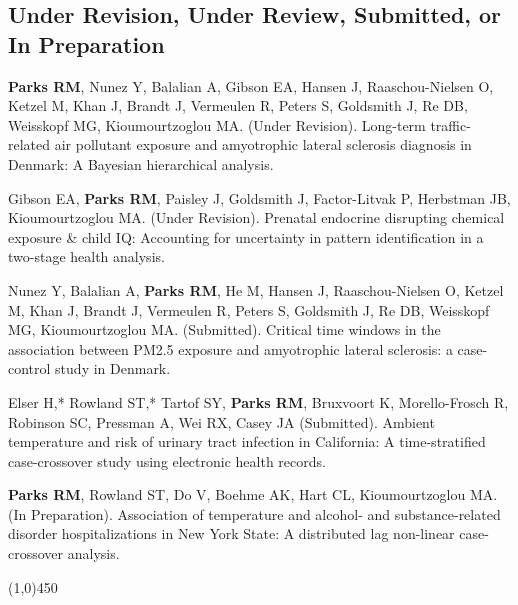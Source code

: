 \subsection*{Under Revision, Under Review, Submitted, or In Preparation}

\noindent \textbf{Parks RM}, Nunez Y, Balalian A,  Gibson EA, Hansen J, Raaschou-Nielsen O, Ketzel M, Khan J, Brandt J, Vermeulen R, Peters S, Goldsmith J, Re DB, Weisskopf MG, Kioumourtzoglou MA. (Under Revision). Long-term traffic-related air pollutant exposure and amyotrophic lateral sclerosis diagnosis in Denmark: A Bayesian hierarchical analysis. \medskip

\noindent Gibson EA, \textbf{Parks RM}, Paisley J, Goldsmith J, Factor-Litvak P, Herbstman JB, Kioumourtzoglou MA. (Under Revision). Prenatal endocrine disrupting chemical exposure \& child IQ: Accounting for uncertainty in pattern identification in a two-stage health analysis. \medskip

\noindent Nunez Y, Balalian A, \textbf{Parks RM}, He M, Hansen J, Raaschou-Nielsen O, Ketzel M, Khan J, Brandt J, Vermeulen R, Peters S, Goldsmith J, Re DB, Weisskopf MG, Kioumourtzoglou MA. (Submitted). Critical time windows in the association between PM2.5 exposure and amyotrophic lateral sclerosis: a case-control study in Denmark. \medskip

\noindent Elser H,* Rowland ST,* Tartof SY, \textbf{Parks RM}, Bruxvoort K, Morello-Frosch R, Robinson SC, Pressman A, Wei RX, Casey JA (Submitted). Ambient temperature and risk of urinary tract infection in California: A time-stratified case-crossover study using electronic health records. \medskip

\noindent \textbf{Parks RM}, Rowland ST, Do V, Boehme AK, Hart CL, Kioumourtzoglou MA. (In Preparation). Association of temperature and alcohol- and substance-related disorder hospitalizations in New York State: A distributed lag non-linear case-crossover analysis.



											
\begin{center} \line(1,0){450} \end{center}